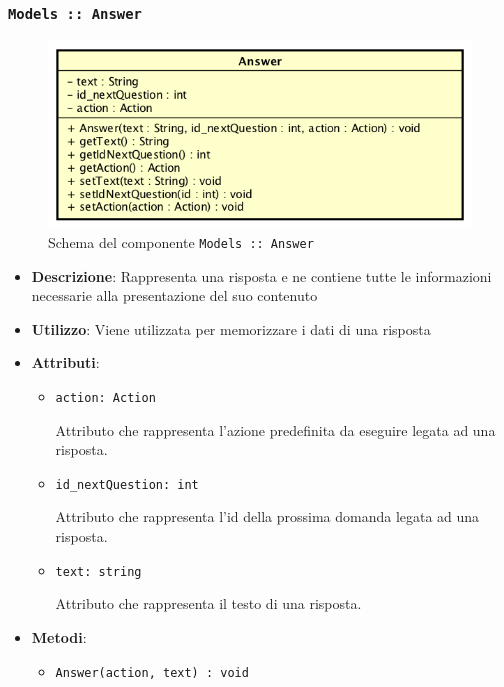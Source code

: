 \documentclass[../DefinizioneDiProdotto.tex]{subfiles}
\begin{document}
\begin{itemize}
	\subsubsection{\texttt{Models :: Answer}}
	\begin{figure}[!h]
		\centering
		\includegraphics[scale=0.7]{Architettura/Models/Answer.png}
		\caption{Schema del componente \texttt{Models :: Answer}}
	\end{figure}
	\begin{itemize}\item \textbf{Descrizione}: Rappresenta una risposta e ne contiene tutte le informazioni necessarie alla presentazione del suo contenuto
	\item \textbf{Utilizzo}: Viene utilizzata per memorizzare i dati di una risposta
	\item \textbf{Attributi}:
	\begin{itemize}
	\item \texttt{action: Action}\

	 Attributo che rappresenta l'azione predefinita da eseguire legata ad una risposta.
	\end{itemize}
	\begin{itemize}
	\item \texttt{id\_nextQuestion: int}\

	 Attributo che rappresenta l'id della prossima domanda legata ad una risposta.
	\end{itemize}
	\begin{itemize}
	\item \texttt{text: string}\

	 Attributo che rappresenta il testo di una risposta.
	\end{itemize}
	\item \textbf{Metodi}:
	\begin{itemize}
	\item \texttt{Answer(action, text) : void}\


\end{itemize}
\end{itemize}
\end{itemize}
\end{document}
